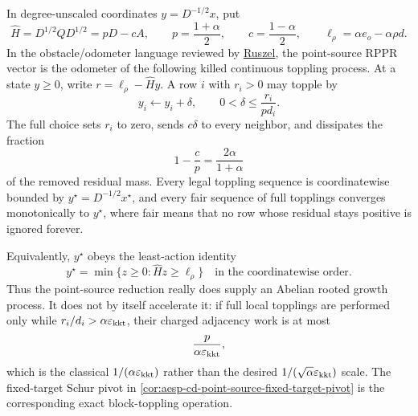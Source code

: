 \begin{proposition}
\label{prop:aesp-cd-point-source-dissipative-sandpile}
In degree-unscaled coordinates \(y=D^{-1/2}x\), put
\begin{equation*}
 \widehat H=D^{1/2}QD^{1/2}=pD-cA,
 \qquad
 p=\frac{1+\alpha}{2},
 \qquad
 c=\frac{1-\alpha}{2},
 \qquad
 \ell_\rho=\alpha e_o-\alpha\rho d.
\end{equation*}
In the obstacle/odometer language reviewed by
\href{https://arxiv.org/abs/1903.06263}{Ruszel}, the point-source RPPR vector
is the odometer of the following killed continuous toppling process.  At a
state \(y\geq0\), write
\(r=\ell_\rho-\widehat Hy\).  A row \(i\) with \(r_i>0\) may topple by
\begin{equation}
 y_i\leftarrow y_i+\delta,
 \qquad
 0<\delta\leq\frac{r_i}{p d_i}.
 \label{eq:aesp-cd-point-source-toppling}
\end{equation}
The full choice sets \(r_i\) to zero, sends \(c\delta\) to every neighbor,
and dissipates the fraction
\begin{equation*}
 1-\frac{c}{p}=\frac{2\alpha}{1+\alpha}
\end{equation*}
of the removed residual mass.  Every legal toppling sequence is
coordinatewise bounded by \(y^\star=D^{-1/2}x^\star\), and every fair
sequence of full topplings converges monotonically to \(y^\star\), where
fair means that no row whose residual stays positive is ignored forever.

Equivalently, \(y^\star\) obeys the least-action identity
\begin{equation}
 y^\star
 =\min\{z\geq0:\widehat Hz\geq\ell_\rho\}
 \quad\text{in the coordinatewise order.}
 \label{eq:aesp-cd-point-source-least-action}
\end{equation}
Thus the point-source reduction really does supply an Abelian rooted growth
process.  It does not by itself accelerate it: if full local topplings are
performed only while \(r_i/d_i>\alpha\varepsilon_{\mathrm{kkt}}\), their charged adjacency work
is at most
\begin{equation}
 \frac{p}{\alpha\varepsilon_{\mathrm{kkt}}},
 \label{eq:aesp-cd-point-source-toppling-work}
\end{equation}
which is the classical \(1/(\alpha\varepsilon_{\mathrm{kkt}})\) rather than the desired
\(1/(\sqrt\alpha\varepsilon_{\mathrm{kkt}})\) scale.  The fixed-target Schur pivot in
\cref{cor:aesp-cd-point-source-fixed-target-pivot} is the corresponding
exact block-toppling operation.
\end{proposition}

